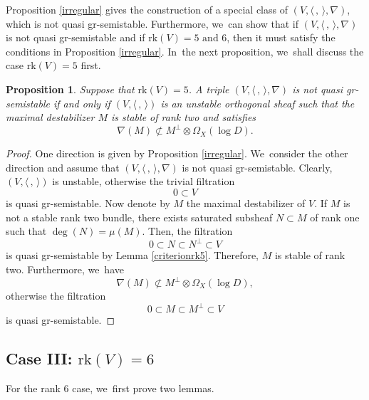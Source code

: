 \documentclass[11pt]{article}
\numberwithin{equation}{section}
\newcommand{\grsemistable}{gr\nobreakdash-semi\-stable\xspace}
\newcommand{\rk}{\mathrm{rk}}
\theoremstyle{plain}
\newtheorem{prop}[thm]{Proposition}
\theoremstyle{definition}
\begin{document}
Proposition \ref{irregular} gives the construction of a special class of $(V, \langle \,,\, \rangle, \nabla)$, which is not quasi \grsemistable. Furthermore, we~can show that if $(V, \langle \,,\, \rangle, \nabla)$ is not quasi \grsemistable and if $\rk(V)=5 \text{ and } 6$, then it must satisfy the conditions in Proposition \ref{irregular}. In~the next proposition, we~shall discuss the case $\rk(V)=5$ first.

\begin{prop}\label{classfication5}
Suppose that $\rk(V)=5$. A triple $(V,\langle \,, \, \rangle,\nabla)$ is not quasi \grsemistable if and only if $(V, \langle \,, \, \rangle)$ is an unstable orthogonal sheaf such that the maximal destabilizer $M$ is stable of rank two and satisfies
\[
\nabla(M)\not\subset M^\perp\otimes\Omega_X(\log D).
\]
\end{prop}

\begin{proof} 
One direction is given by Proposition \ref{irregular}. We~consider the other direction and assume that $(V,\langle \,, \, \rangle,\nabla)$ is not quasi \grsemistable. Clearly, $(V, \langle \,, \, \rangle)$ is unstable, otherwise the trivial filtration
\[
0\subset V
\]
is quasi \grsemistable. Now denote by $M$ the maximal destabilizer of $V$. If $M$ is not a stable rank two bundle, there exists saturated subsheaf $N \subset M$ of rank one such that $\deg(N)=\mu(M)$. Then, the filtration
\[
0\subset N\subset N^\perp\subset V
\]
is quasi \grsemistable by Lemma \ref{criterionrk5}. Therefore, $M$ is stable of rank two. Furthermore, we~have
\[
\nabla(M)\not\subset M^\perp\otimes\Omega_X(\log D),
\]
otherwise the filtration
\[
0\subset M \subset M^\perp\subset V
\]
is quasi \grsemistable.
\end{proof}

\subsection{Case III: ${\rk(V) = 6}$}
For the rank $6$ case, we~first prove two lemmas.
\end{document}
